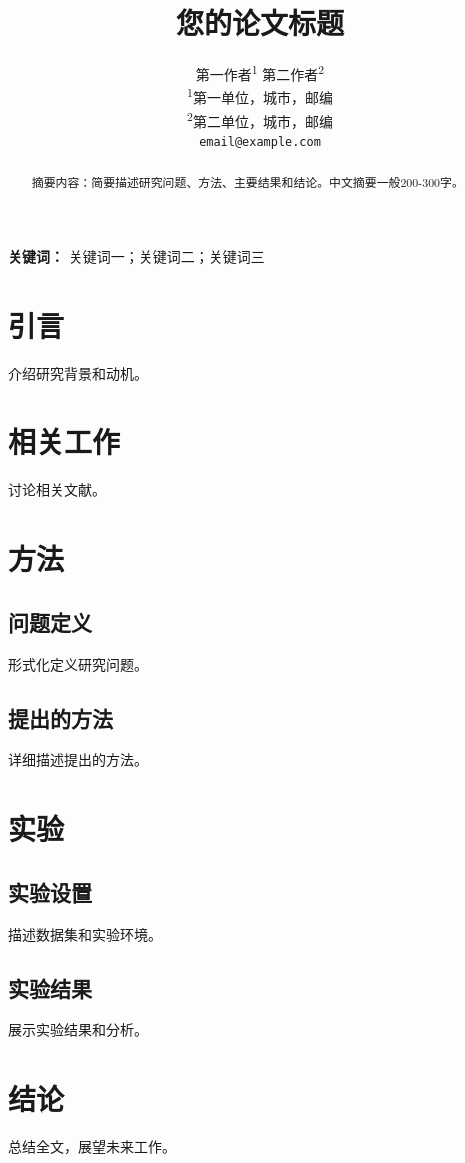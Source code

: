 \documentclass[a4paper,11pt]{article}
\title{\textbf{您的论文标题}}
\author{
  第一作者\textsuperscript{1} \quad
  第二作者\textsuperscript{2} \\[6pt]
  \textsuperscript{1}第一单位，城市，邮编 \\
  \textsuperscript{2}第二单位，城市，邮编 \\
  \texttt{email@example.com}
}
\date{}
\begin{document}
\maketitle

\begin{abstract}
摘要内容：简要描述研究问题、方法、主要结果和结论。中文摘要一般200-300字。
\end{abstract}

\noindent\textbf{关键词：} 关键词一；关键词二；关键词三

\section{引言}
介绍研究背景和动机。

\section{相关工作}
讨论相关文献。

\section{方法}
\subsection{问题定义}
形式化定义研究问题。

\subsection{提出的方法}
详细描述提出的方法。

\section{实验}
\subsection{实验设置}
描述数据集和实验环境。

\subsection{实验结果}
展示实验结果和分析。

\section{结论}
总结全文，展望未来工作。



\end{document}
